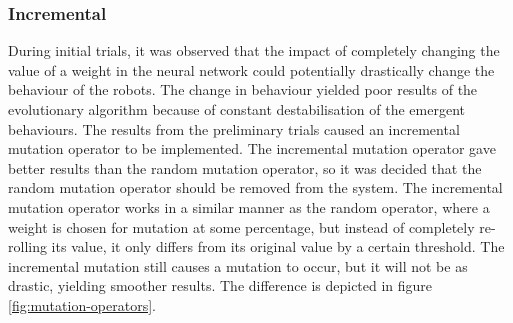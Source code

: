 \subsubsection{Incremental}
During initial trials, it was observed that the impact of completely changing the value of a weight in the neural network could potentially drastically change the behaviour of the robots.
The change in behaviour yielded poor results of the evolutionary algorithm because of constant destabilisation of the emergent behaviours.
The results from the preliminary trials caused an incremental mutation operator to be implemented.
The incremental mutation operator gave better results than the random mutation operator, so it was decided that the random mutation operator should be removed from the system. 
The incremental mutation operator works in a similar manner as the random operator, where a weight is chosen for mutation at some percentage, but instead of completely re-rolling its value, it only differs from its original value by a certain threshold.
The incremental mutation still causes a mutation to occur, but it will not be as drastic, yielding smoother results.
The difference is depicted in figure \ref{fig:mutation-operators}.

